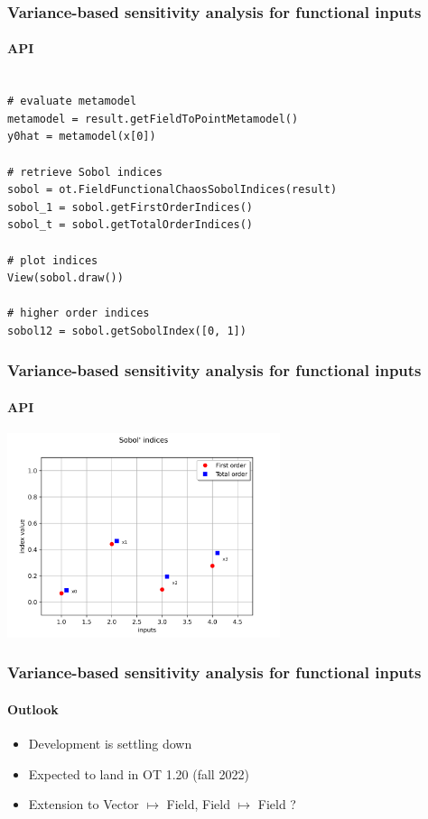 \documentclass[aspectratio=169]{beamer}
\begin{document}
\begin{frame}[containsverbatim]
\frametitle{Variance-based sensitivity analysis for functional inputs}

\framesubtitle{API}

\lstset{language=python}
\begin{lstlisting}

# evaluate metamodel
metamodel = result.getFieldToPointMetamodel()
y0hat = metamodel(x[0])

# retrieve Sobol indices
sobol = ot.FieldFunctionalChaosSobolIndices(result)
sobol_1 = sobol.getFirstOrderIndices()
sobol_t = sobol.getTotalOrderIndices()

# plot indices
View(sobol.draw())

# higher order indices
sobol12 = sobol.getSobolIndex([0, 1])

\end{lstlisting}

\end{frame}

\begin{frame}[containsverbatim]
\frametitle{Variance-based sensitivity analysis for functional inputs}

\framesubtitle{API}

\begin{center}
\includegraphics[width=0.6\textwidth]{figures/sobol.png}
\end{center}

\end{frame}


\begin{frame}[containsverbatim]
\frametitle{Variance-based sensitivity analysis for functional inputs}

\framesubtitle{Outlook}

\begin{itemize}
\item Development is settling down
\item Expected to land in OT 1.20 (fall 2022)
\item Extension to Vector $\mapsto$ Field, Field $\mapsto$ Field ?
\end{itemize}

\end{frame}
\end{document}
